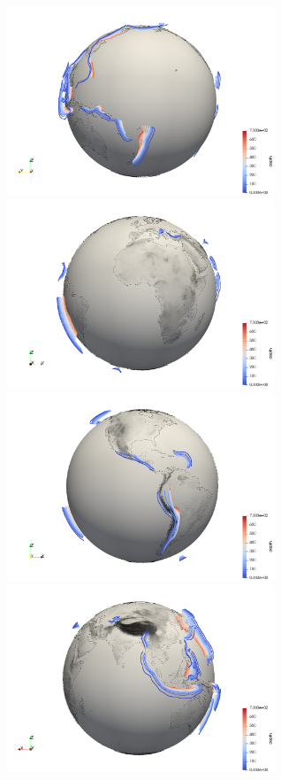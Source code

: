 \begin{center}
\includegraphics[width=8cm]{python_codes/fieldstone_136/images/view1}
\includegraphics[width=8cm]{python_codes/fieldstone_136/images/view2}\\
\includegraphics[width=8cm]{python_codes/fieldstone_136/images/view3}
\includegraphics[width=8cm]{python_codes/fieldstone_136/images/view4}
\end{center}
